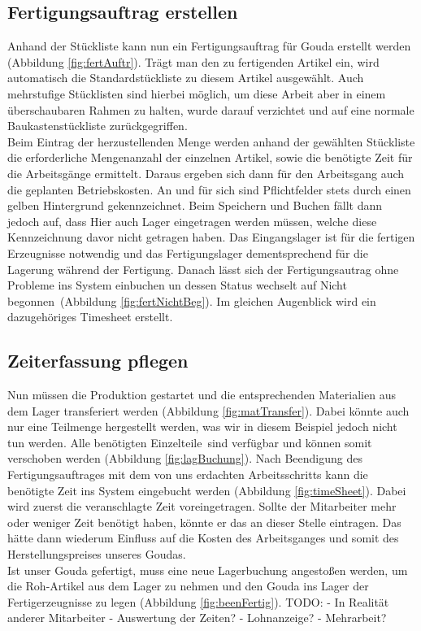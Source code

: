 \subsection{Fertigungsauftrag erstellen}
Anhand der Stückliste kann nun ein Fertigungsauftrag für Gouda erstellt werden (\vgl Abbildung \ref{fig:fertAuftr}). Trägt man den zu fertigenden Artikel ein, wird automatisch die Standardstückliste zu diesem Artikel ausgewählt. Auch mehrstufige Stücklisten sind hierbei möglich, um diese Arbeit aber in einem überschaubaren Rahmen zu halten, wurde darauf verzichtet und auf eine normale Baukastenstückliste zurückgegriffen. \\
Beim Eintrag der herzustellenden Menge werden anhand der gewählten Stückliste die erforderliche Mengenanzahl der einzelnen Artikel, sowie die benötigte Zeit für die Arbeitsgänge ermittelt. Daraus ergeben sich dann für den Arbeitsgang auch die geplanten Betriebskosten.
An und für sich sind Pflichtfelder stets durch einen gelben Hintergrund gekennzeichnet. Beim Speichern und Buchen fällt dann jedoch auf, dass Hier auch Lager eingetragen werden müssen, welche diese Kennzeichnung davor nicht getragen haben. Das Eingangslager ist für die fertigen Erzeugnisse notwendig und das Fertigungslager dementsprechend für die Lagerung während der Fertigung. Danach lässt sich der Fertigungsautrag ohne Probleme ins System einbuchen un dessen Status wechselt auf \glqq Nicht begonnen\grqq\ (\vgl Abbildung \ref{fig:fertNichtBeg}). Im gleichen Augenblick wird ein dazugehöriges Timesheet erstellt.

\subsection{Zeiterfassung pflegen}
Nun müssen die Produktion gestartet und die entsprechenden Materialien aus dem Lager transferiert werden (\vgl Abbildung \ref{fig:matTransfer}). Dabei könnte auch nur eine Teilmenge hergestellt werden, was wir in diesem Beispiel jedoch nicht tun werden. Alle benötigten \glqq Einzelteile\grqq\ sind verfügbar und können somit verschoben werden (\vgl Abbildung \ref{fig:lagBuchung}). Nach Beendigung des Fertigungsauftrages mit dem von uns erdachten Arbeitsschritts kann die benötigte Zeit ins System eingebucht werden (\vgl Abbildung \ref{fig:timeSheet}). Dabei wird zuerst die veranschlagte Zeit voreingetragen. Sollte der Mitarbeiter mehr oder weniger Zeit benötigt haben, könnte er das an dieser Stelle eintragen. Das hätte dann wiederum Einfluss auf die Kosten des Arbeitsganges und somit des Herstellungspreises unseres Goudas. \\
Ist unser Gouda gefertigt, muss eine neue Lagerbuchung angestoßen werden, um die Roh-Artikel aus dem Lager zu nehmen und den Gouda ins Lager der Fertigerzeugnisse zu legen (\vgl Abbildung \ref{fig:beenFertig}).
TODO: - In Realität anderer Mitarbeiter
- Auswertung der Zeiten?
- Lohnanzeige?
- Mehrarbeit?

